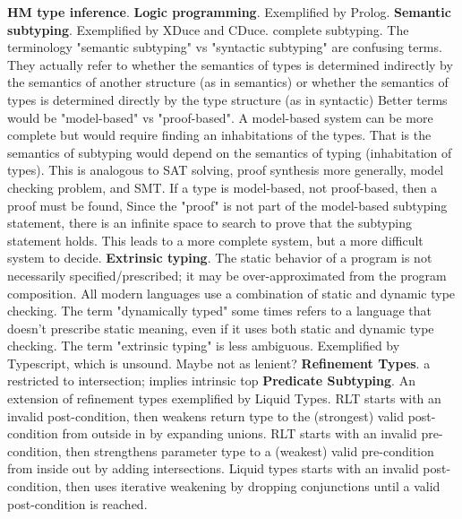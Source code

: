 \documentclass[letterpaper]{llncs}
\begin{document}
\textbf{HM type inference}.  \newline
\textbf{Logic programming}. Exemplified by Prolog. \newline
\textbf{Semantic subtyping}. Exemplified by XDuce and CDuce. complete subtyping.
The terminology "semantic subtyping" vs "syntactic subtyping" are confusing terms. 
They actually refer 
to whether the semantics of types is determined indirectly by the semantics of another structure (as in semantics)
or whether the semantics of types is determined directly by the type structure (as in syntactic) 
Better terms would be "model-based" vs "proof-based".
A model-based system can be more complete but would require finding an inhabitations of the types.
That is the semantics of subtyping would depend on the semantics of typing (inhabitation of types).
This is analogous to SAT solving, proof synthesis more generally, model checking problem, and SMT.
If a type is model-based, not proof-based, then a proof must be found,
Since the "proof" is not part of the model-based subtyping statement, 
there is an infinite space to search to prove that the subtyping statement holds.
This leads to a more complete system, but a more difficult system to decide.
\newline
\textbf{Extrinsic typing}. The static behavior of a program is not necessarily specified/prescribed; 
it may be over-approximated from the program composition. 
All modern languages use a combination of static and dynamic type checking.
The term "dynamically typed" some times refers to a language that doesn't prescribe static meaning,
even if it uses both static and dynamic type checking. The term "extrinsic typing" is less ambiguous.
Exemplified by Typescript, which is unsound. Maybe not as lenient?  
\newline
\textbf{Refinement Types}. a restricted to intersection; implies intrinsic top\newline
\textbf{Predicate Subtyping}. An extension of refinement types exemplified by Liquid Types.
RLT starts with an invalid post-condition, then weakens return type to the (strongest) valid post-condition from outside in by expanding unions. 
RLT starts with an invalid pre-condition, then strengthens parameter type to a (weakest) valid pre-condition from inside out by adding intersections. 
Liquid types starts with an invalid post-condition, then uses iterative weakening by dropping conjunctions until a valid post-condition is reached.
\end{document}
